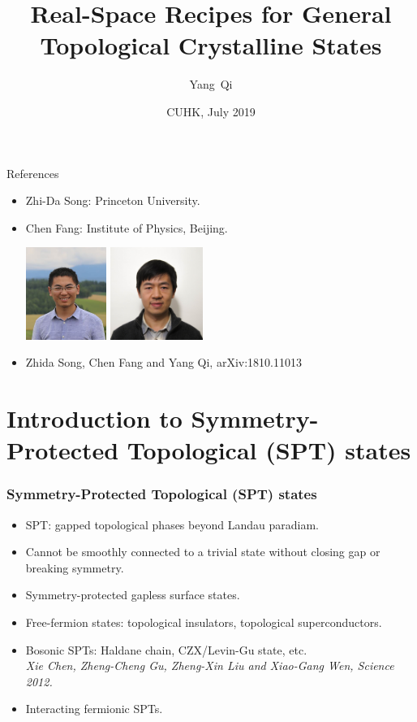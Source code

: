 \documentclass[xcolor=table, 10pt, aspectratio=43]{beamer}
\title[Space-group SPTs] %
{Real-Space Recipes for General Topological Crystalline States}
\author[Y Qi] %
{Yang~Qi}
\institute[Fudan] %
{Department of Physics, Fudan University}
\date{CUHK, July 2019}
\begin{document}
\begin{frame}
  \titlepage
\end{frame}

\begin{frame}{References}
\begin{itemize}
\item Zhi-Da Song: Princeton University.
\item Chen Fang: Institute of Physics, Beijing.
\begin{center}
	\includegraphics[height=3cm]{../people/zhidasong}
	\includegraphics[height=3cm]{../people/chenfang}
\end{center}
\item Zhida Song, Chen Fang and Yang Qi, arXiv:1810.11013
\end{itemize}
\end{frame}

\section{Introduction to Symmetry-Protected Topological (SPT) states}

\begin{frame}
  \frametitle{Symmetry-Protected Topological (SPT) states}
\begin{itemize}
\item SPT: gapped topological phases beyond Landau paradiam.
\item Cannot be smoothly connected to a trivial state without closing gap or breaking symmetry.
\item Symmetry-protected gapless surface states.
\item Free-fermion states: topological insulators, topological superconductors.
\item Bosonic SPTs: Haldane chain, CZX/Levin-Gu state, etc.\\
\emph{Xie Chen, Zheng-Cheng Gu, Zheng-Xin Liu and Xiao-Gang Wen, Science 2012.}
\item Interacting fermionic SPTs.
\end{itemize}
\end{frame}
\end{document}

